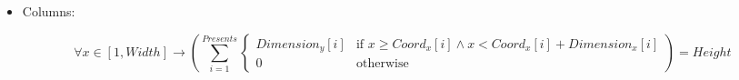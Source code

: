 \begin{itemize}
\begin{itemize}
\begin{adjustwidth}{-3.3cm}{}
\begin{equation*}
                \forall y \in [1, Height] \rightarrow (\sum_{i = 1}^{Presents}{
                    \begin{cases}
                        Dimension_x[i] & \text{if } y \geq Coord_y[i] \wedge y < Coord_y[i] + Dimension_y[i] \\
                        0 & \text{otherwise}
                    \end{cases}
                }) = Width
            \end{equation*}\end{adjustwidth}
            \item[] Columns:
            \begin{adjustwidth}{-3.3cm}{}\begin{equation*} 
                \forall x \in [1, Width] \rightarrow (\sum_{i = 1}^{Presents}{
                    \begin{cases}
                        Dimension_y[i] & \text{if } x \geq Coord_x[i] \wedge x < Coord_x[i] + Dimension_x[i] \\
                        0 & \text{otherwise}
                    \end{cases}
                }) = Height
            \end{equation*}\end{adjustwidth}
        \end{itemize}
\end{itemize}

\newpage
